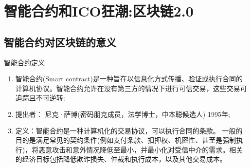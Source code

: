 \documentclass[11pt]{beamer}
\begin{document}
\section{智能合约和ICO狂潮:区块链2.0}
\subsection{智能合约对区块链的意义}
\begin{frame}{智能合约定义}
	
	\begin{enumerate}
		\item 智能合约(Smart contract)是一种旨在以信息化方式传播、验证或执行合同的计算机协议。智能合约允许在没有第三方的情况下进行可信交易，这些交易可追踪且不可逆转;
		\item 提出者： 尼克·萨博(密码朋克成员，法学博士，中本聪候选人) 1995年;
		\item 定义：智能合约是一种计算机化的交易协议，可以执行合同的条款。
		{\footnotesize 一般的目的是满足常见的契约条件(例如支付条款、扣押权、机密性、甚至是强制执行)，将恶意攻击和意外情况降低至最小，并最小化对受信中介的需求。相关的经济目标包括降低欺诈损失、仲裁和执行成本，以及其他交易成本。}
	\end{enumerate}

\end{frame}
\end{document}
